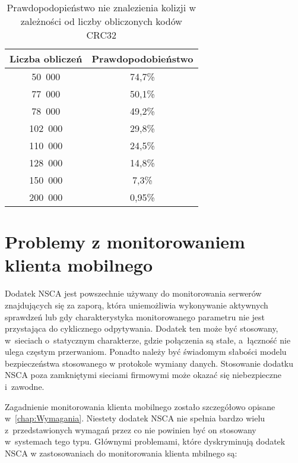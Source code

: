 \begin{table}
\centering
\caption{Prawdopodopieństwo nie znalezienia kolizji w zależności od
  liczby obliczonych kodów CRC32}
\label{tab:CRC32Colisions}
\begin{tabular}{|c|c|}
\hline
Liczba obliczeń & Prawdopodobieństwo \\
\hline
50~000 & 74,7\% \\
\hline
77~000 & 50,1\% \\
\hline
78~000 & 49,2\% \\
\hline
102~000 & 29,8\% \\
\hline
110~000 & 24,5\% \\
\hline
128~000 & 14,8\% \\
\hline
150~000 & 7,3\% \\
\hline
200~000 & 0,95\% \\
\hline
\end{tabular}
\end{table} 

\section[Problemy][Problemy z monitorowaniem klienta mobilnego]{Problemy z monitorowaniem klienta mobilnego}

Dodatek NSCA jest powszechnie używany do monitorowania serwerów
znajdujących się za zaporą, która uniemożliwia wykonywanie aktywnych
sprawdzeń lub gdy charakterystyka monitorowanego parametru nie jest
przystająca do cyklicznego odpytywania. Dodatek ten może być
stosowany, w~sieciach o~statycznym charakterze, gdzie połączenia są
stałe, a~łączność nie ulega częstym przerwaniom. Ponadto należy być
świadomym słabości modelu bezpieczeństwa stosowanego w protokole wymiany
danych. Stosowanie dodatku NSCA poza zamkniętymi sieciami firmowymi
może okazać się niebezpieczne i~zawodne.

Zagadnienie monitorowania klienta mobilnego zostało szczegółowo opisane
w~\ref{chap:Wymagania}. Niestety dodatek NSCA nie spełnia bardzo wielu
z~przedstawionych wymagań przez co nie powinien być on stosowany
w~systemach tego typu. Głównymi problemami, które dyskryminują dodatek
NSCA w zastosowaniach do monitorowania klienta mbilnego są:

